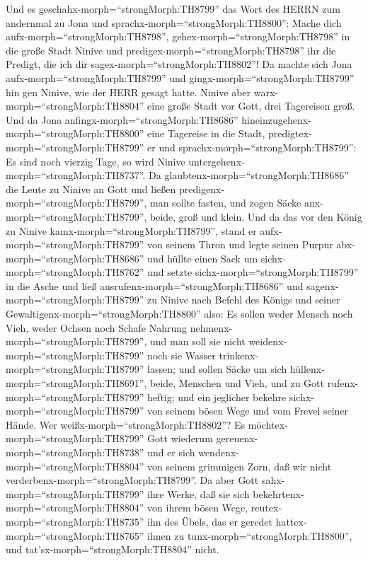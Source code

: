  Und es geschahx-morph=``strongMorph:TH8799'' das Wort des
HERRN zum andernmal zu Jona und sprachx-morph=``strongMorph:TH8800'':
 Mache dich aufx-morph=``strongMorph:TH8798'',
gehex-morph=``strongMorph:TH8798'' in die große Stadt Ninive und
predigex-morph=``strongMorph:TH8798'' ihr die Predigt, die ich dir
sagex-morph=``strongMorph:TH8802''!  Da machte sich Jona
aufx-morph=``strongMorph:TH8799'' und gingx-morph=``strongMorph:TH8799''
hin gen Ninive, wie der HERR gesagt hatte. Ninive aber
warx-morph=``strongMorph:TH8804'' eine große Stadt vor Gott, drei
Tagereisen groß.  Und da Jona
anfingx-morph=``strongMorph:TH8686''
hineinzugehenx-morph=``strongMorph:TH8800'' eine Tagereise in die Stadt,
predigtex-morph=``strongMorph:TH8799'' er und
sprachx-morph=``strongMorph:TH8799'': Es sind noch vierzig Tage, so wird
Ninive untergehenx-morph=``strongMorph:TH8737''.  Da
glaubtenx-morph=``strongMorph:TH8686'' die Leute zu Ninive an Gott und
ließen predigenx-morph=``strongMorph:TH8799'', man sollte fasten, und
zogen Säcke anx-morph=``strongMorph:TH8799'', beide, groß und klein.
 Und da das vor den König zu Ninive
kamx-morph=``strongMorph:TH8799'', stand er
aufx-morph=``strongMorph:TH8799'' von seinem Thron und legte seinen
Purpur abx-morph=``strongMorph:TH8686'' und hüllte einen Sack um
sichx-morph=``strongMorph:TH8762'' und setzte
sichx-morph=``strongMorph:TH8799'' in die Asche  und ließ
ausrufenx-morph=``strongMorph:TH8686'' und
sagenx-morph=``strongMorph:TH8799'' zu Ninive nach Befehl des Königs und
seiner Gewaltigenx-morph=``strongMorph:TH8800'' also: Es sollen weder
Mensch noch Vieh, weder Ochsen noch Schafe Nahrung
nehmenx-morph=``strongMorph:TH8799'', und man soll sie nicht
weidenx-morph=``strongMorph:TH8799'' noch sie Wasser
trinkenx-morph=``strongMorph:TH8799'' lassen;  und sollen
Säcke um sich hüllenx-morph=``strongMorph:TH8691'', beide, Menschen und
Vieh, und zu Gott rufenx-morph=``strongMorph:TH8799'' heftig; und ein
jeglicher bekehre sichx-morph=``strongMorph:TH8799'' von seinem bösen
Wege und vom Frevel seiner Hände.  Wer
weißx-morph=``strongMorph:TH8802''? Es
möchtex-morph=``strongMorph:TH8799'' Gott wiederum
gereuenx-morph=``strongMorph:TH8738'' und er sich
wendenx-morph=``strongMorph:TH8804'' von seinem grimmigen Zorn, daß wir
nicht verderbenx-morph=``strongMorph:TH8799''.  Da aber
Gott sahx-morph=``strongMorph:TH8799'' ihre Werke, daß sie sich
bekehrtenx-morph=``strongMorph:TH8804'' von ihrem bösen Wege,
reutex-morph=``strongMorph:TH8735'' ihn des Übels, das er geredet
hattex-morph=``strongMorph:TH8765'' ihnen zu
tunx-morph=``strongMorph:TH8800'', und
tat'sx-morph=``strongMorph:TH8804'' nicht.

